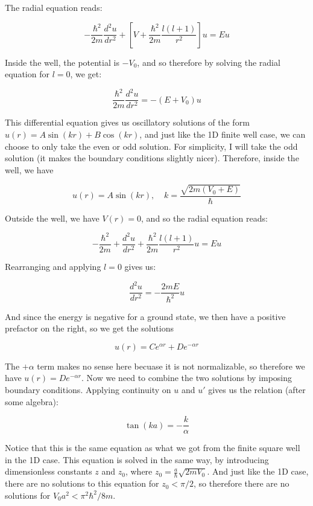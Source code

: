 \documentclass[10pt]{article}
\begin{document}
    \begin{solution}
        The radial equation reads:


        \[ -\frac{\hbar^2}{2m} \frac{d^2u}{dr^2} + \left[ V + \frac{\hbar^2}{2m} \frac{l(l+1)}{r^2}\right]u = Eu\] 

        Inside the well, the potential is $-V_0$, and so therefore by solving the radial equation for $l = 0$, we get: 

        \[ \frac{\hbar^2}{2m} \frac{d^2u}{dr^2} = -(E + V_0) u\] 

        This differential equation gives us oscillatory solutions of the form $u(r) = A \sin(kr) + B \cos (kr)$, and just like the 1D finite well case, we can choose to only take the even or odd solution. For simplicity, I will take the odd solution (it makes the boundary conditions slightly nicer). Therefore, inside the well, we have 

        \[ u(r) = A \sin (kr), \phantom{aa} k = \frac{\sqrt{2m(V_0 + E)}}{\hbar}\]

        Outside the well, we have $V(r) = 0$, and so the radial equation reads: 

        \[ -\frac{\hbar^2}{2m} + \frac{d^2u}{dr^2} + \frac{\hbar^2}{2m} \frac{l(l+1)}{r^2}u = Eu\] 

        Rearranging and applying $l = 0$ gives us: 

        \[ \frac{d^2u}{dr^2} = -\frac{2mE}{\hbar^2} u\]

        And since the energy is negative for a ground state, we then have a positive prefactor on the right, so we get the solutions 

        \[ u(r) = Ce^{\alpha r} + De^{-\alpha r}\] 

        The $+\alpha$ term makes no sense here becuase it is not normalizable, so therefore we have $u(r) = De^{-\alpha r}$. Now we need to combine the two solutions by imposing boundary conditions. Applying continuity on $u$ and $u'$ gives us the relation (after some algebra): 

        \[ \tan(ka) = -\frac{k}{\alpha}\] 

        Notice that this is the same equation as what we got from the finite square well in the 1D case. This equation is solved in the same way, by introducing dimensionless constants $z$ and $z_0$, where $z_0 = \frac{a}{\hbar}\sqrt{2mV_0}$. And just like the 1D case, there are no solutions to this equation for $z_0 < \pi/2$, so therefore there are no solutions for $V_0 a^2 < \pi^2 \hbar^2/8m$. 
    
    \end{solution}
\end{document}

